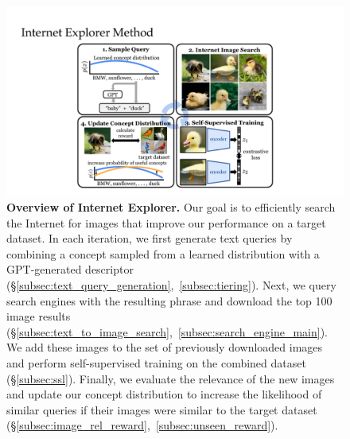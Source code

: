 \begin{figure}[t]
    \centering
    \includegraphics[width=0.8\linewidth]{figures/method_fig2.pdf}
    \caption{\textbf{Overview of Internet Explorer.} Our goal is to efficiently search the Internet for images that improve our performance on a target dataset.
        In each iteration, we first generate text queries by combining a concept sampled from a learned distribution with a GPT-generated descriptor (\S\ref{subsec:text_query_generation},~\ref{subsec:tiering}). Next, we query search engines with the resulting phrase and download the top 100 image results (\S\ref{subsec:text_to_image_search},~\ref{subsec:search_engine_main}). We add these images to the set of previously downloaded images and perform self-supervised training on the combined dataset (\S\ref{subsec:ssl}). Finally, we evaluate the relevance of the new images and update our concept distribution to increase the likelihood of similar queries if their images were similar to the target dataset (\S\ref{subsec:image_rel_reward},~\ref{subsec:unseen_reward}).
    }
    \label{fig:method}
\end{figure}


